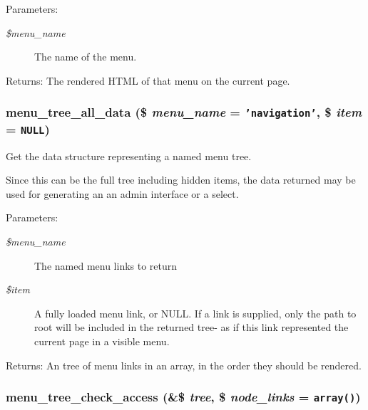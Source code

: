 \begin{Desc}
\item[Parameters:]
\begin{description}
\item[{\em \$menu\_\-name}]The name of the menu. \end{description}
\end{Desc}
\begin{Desc}
\item[Returns:]The rendered HTML of that menu on the current page. \end{Desc}
\hypertarget{group__menu_ga4b0957cc1027dae4f4093b1b884227d}{
\subsubsection[{menu\_\-tree\_\-all\_\-data}]{\setlength{\rightskip}{0pt plus 5cm}menu\_\-tree\_\-all\_\-data (\$ {\em menu\_\-name} = {\tt 'navigation'}, \/  \$ {\em item} = {\tt NULL})}}
\label{group__menu_ga4b0957cc1027dae4f4093b1b884227d}


Get the data structure representing a named menu tree.

Since this can be the full tree including hidden items, the data returned may be used for generating an an admin interface or a select.

\begin{Desc}
\item[Parameters:]
\begin{description}
\item[{\em \$menu\_\-name}]The named menu links to return \item[{\em \$item}]A fully loaded menu link, or NULL. If a link is supplied, only the path to root will be included in the returned tree- as if this link represented the current page in a visible menu. \end{description}
\end{Desc}
\begin{Desc}
\item[Returns:]An tree of menu links in an array, in the order they should be rendered. \end{Desc}
\hypertarget{group__menu_g6374db210d96026fb70431def083a7a5}{
\subsubsection[{menu\_\-tree\_\-check\_\-access}]{\setlength{\rightskip}{0pt plus 5cm}menu\_\-tree\_\-check\_\-access (\&\$ {\em tree}, \/  \$ {\em node\_\-links} = {\tt array()})}}
\label{group__menu_g6374db210d96026fb70431def083a7a5}


